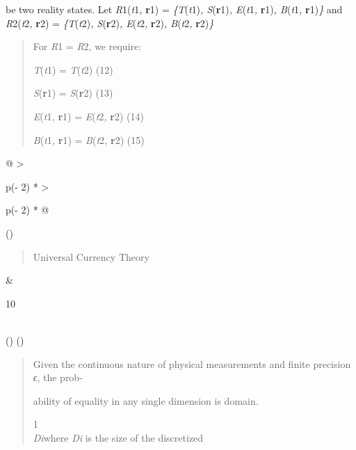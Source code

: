 \documentclass[
]{article}
\begin{document}
be two reality states. Let \emph{R}1(\emph{t}1\emph{,} \textbf{r}1) =
\emph{\{T}(\emph{t}1)\emph{, S}(\textbf{r}1)\emph{, E}(\emph{t}1\emph{,}
\textbf{r}1)\emph{, B}(\emph{t}1\emph{,} \textbf{r}1)\emph{\}} and
\emph{R}2(\emph{t}2\emph{,} \textbf{r}2) = \emph{\{T}(\emph{t}2)\emph{,
S}(\textbf{r}2)\emph{, E}(\emph{t}2\emph{,} \textbf{r}2)\emph{,
B}(\emph{t}2\emph{,} \textbf{r}2)\emph{\}}

\begin{quote}
For \emph{R}1 = \emph{R}2, we require:

\emph{T}(\emph{t}1) = \emph{T}(\emph{t}2) (12)

\emph{S}(\textbf{r}1) = \emph{S}(\textbf{r}2) (13)

\emph{E}(\emph{t}1\emph{,} \textbf{r}1) = \emph{E}(\emph{t}2\emph{,}
\textbf{r}2) (14)

\emph{B}(\emph{t}1\emph{,} \textbf{r}1) = \emph{B}(\emph{t}2\emph{,}
\textbf{r}2) (15)
\end{quote}

\begin{longtable}[]{@{}
  >{\raggedright\arraybackslash}p{(\columnwidth - 2\tabcolsep) * }
  >{\raggedright\arraybackslash}p{(\columnwidth - 2\tabcolsep) * }@{}}
\toprule()
\begin{minipage}[b]{\linewidth}\raggedright
\begin{quote}
Universal Currency Theory
\end{quote}
\end{minipage} & \begin{minipage}[b]{\linewidth}\raggedright
10
\end{minipage} \\
\midrule()
\endhead
\bottomrule()
\end{longtable}

\begin{quote}
Given the continuous nature of physical measurements and finite
precision \emph{ϵ}, the prob-

ability of equality in any single dimension is domain.

1\\
\emph{\textbar Di\textbar{}}where \emph{\textbar Di\textbar{}} is the
size of the discretized
\end{quote}
\end{document}
